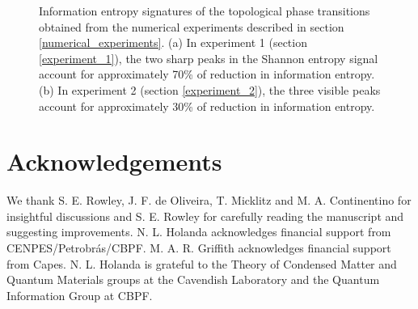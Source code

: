 \documentclass[10pt]{revtex4-1}
\begin{document}
\begin{figure}
\centering
{}\quad
{}\quad
\caption{Information entropy signatures of the topological phase transitions obtained from the numerical experiments described in section \ref{numerical_experiments}. (a) In experiment 1 (section \ref{experiment_1}), the two sharp peaks in the Shannon entropy signal account for approximately 70\% of reduction in information entropy. (b) In experiment 2 (section \ref{experiment_2}), the three visible peaks account for approximately 30\% of reduction in information entropy.}
\label{feature_importances}
\end{figure}

{}

\section*{Acknowledgements}

We thank S. E. Rowley, J. F. de Oliveira, T. Micklitz and M. A. Continentino for insightful discussions and S. E. Rowley for carefully reading the manuscript and suggesting improvements. N. L. Holanda acknowledges financial support from CENPES/Petrobr\'as/CBPF. M. A. R. Griffith acknowledges financial support from Capes. N. L. Holanda is grateful to the Theory of Condensed Matter and Quantum Materials groups at the Cavendish Laboratory and the Quantum Information Group at CBPF.
\end{document}

